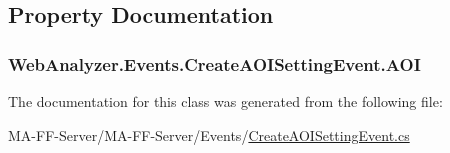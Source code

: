 \subsection{Property Documentation}
\hypertarget{class_web_analyzer_1_1_events_1_1_create_a_o_i_setting_event_a9fd4a39178dd304567bc8439d90a4b32}{}
\subsubsection[{A\+O\+I}]{ Web\+Analyzer.\+Events.\+Create\+A\+O\+I\+Setting\+Event.\+A\+O\+I\hspace{0.3cm}{\ttfamily [get]}}\label{class_web_analyzer_1_1_events_1_1_create_a_o_i_setting_event_a9fd4a39178dd304567bc8439d90a4b32}


The documentation for this class was generated from the following file\+:\begin{DoxyCompactItemize}
\item 
M\+A-\/\+F\+F-\/\+Server/\+M\+A-\/\+F\+F-\/\+Server/\+Events/\hyperlink{_create_a_o_i_setting_event_8cs}{Create\+A\+O\+I\+Setting\+Event.\+cs}\end{DoxyCompactItemize}
